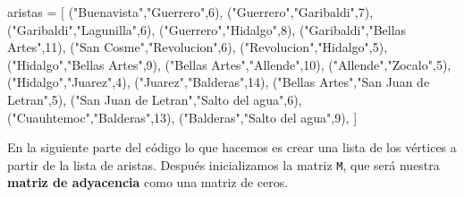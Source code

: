 \documentclass[
]{article}
\newenvironment{Shaded}{}{}
\newcommand{\DecValTok}[1]{\textcolor[rgb]{0.25,0.63,0.44}{#1}}
\newcommand{\NormalTok}[1]{#1}
\newcommand{\OperatorTok}[1]{\textcolor[rgb]{0.40,0.40,0.40}{#1}}
\newcommand{\StringTok}[1]{\textcolor[rgb]{0.25,0.44,0.63}{#1}}
\begin{document}
\begin{Shaded}
\begin{Highlighting}[]
\NormalTok{aristas }\OperatorTok{=}\NormalTok{ [}
\NormalTok{    (}\StringTok{"Buenavista"}\NormalTok{,}\StringTok{"Guerrero"}\NormalTok{,}\DecValTok{6}\NormalTok{),}
\NormalTok{    (}\StringTok{"Guerrero"}\NormalTok{,}\StringTok{"Garibaldi"}\NormalTok{,}\DecValTok{7}\NormalTok{),}
\NormalTok{    (}\StringTok{"Garibaldi"}\NormalTok{,}\StringTok{"Lagunilla"}\NormalTok{,}\DecValTok{6}\NormalTok{),}
\NormalTok{    (}\StringTok{"Guerrero"}\NormalTok{,}\StringTok{"Hidalgo"}\NormalTok{,}\DecValTok{8}\NormalTok{),}
\NormalTok{    (}\StringTok{"Garibaldi"}\NormalTok{,}\StringTok{"Bellas Artes"}\NormalTok{,}\DecValTok{11}\NormalTok{),}
\NormalTok{    (}\StringTok{"San Cosme"}\NormalTok{,}\StringTok{"Revolucion"}\NormalTok{,}\DecValTok{6}\NormalTok{),}
\NormalTok{    (}\StringTok{"Revolucion"}\NormalTok{,}\StringTok{"Hidalgo"}\NormalTok{,}\DecValTok{5}\NormalTok{),}
\NormalTok{    (}\StringTok{"Hidalgo"}\NormalTok{,}\StringTok{"Bellas Artes"}\NormalTok{,}\DecValTok{9}\NormalTok{),}
\NormalTok{    (}\StringTok{"Bellas Artes"}\NormalTok{,}\StringTok{"Allende"}\NormalTok{,}\DecValTok{10}\NormalTok{),}
\NormalTok{    (}\StringTok{"Allende"}\NormalTok{,}\StringTok{"Zocalo"}\NormalTok{,}\DecValTok{5}\NormalTok{),}
\NormalTok{    (}\StringTok{"Hidalgo"}\NormalTok{,}\StringTok{"Juarez"}\NormalTok{,}\DecValTok{4}\NormalTok{),}
\NormalTok{    (}\StringTok{"Juarez"}\NormalTok{,}\StringTok{"Balderas"}\NormalTok{,}\DecValTok{14}\NormalTok{),}
\NormalTok{    (}\StringTok{"Bellas Artes"}\NormalTok{,}\StringTok{"San Juan de Letran"}\NormalTok{,}\DecValTok{5}\NormalTok{),}
\NormalTok{    (}\StringTok{"San Juan de Letran"}\NormalTok{,}\StringTok{"Salto del agua"}\NormalTok{,}\DecValTok{6}\NormalTok{),}
\NormalTok{    (}\StringTok{"Cuauhtemoc"}\NormalTok{,}\StringTok{"Balderas"}\NormalTok{,}\DecValTok{13}\NormalTok{),}
\NormalTok{    (}\StringTok{"Balderas"}\NormalTok{,}\StringTok{"Salto del agua"}\NormalTok{,}\DecValTok{9}\NormalTok{),}
\NormalTok{]}
\end{Highlighting}
\end{Shaded}

En la siguiente parte del código lo que hacemos es crear una lista de
los vértices a partir de la lista de aristas. Después inicializamos la
matriz \texttt{M}, que será nuestra \textbf{matriz de adyacencia} como
una matriz de ceros.
\end{document}
